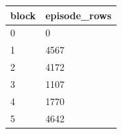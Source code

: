 \begin{tabular}{ll}
\toprule
block & episode\_rows \\
\midrule
0 & 0 \\
1 & 4567 \\
2 & 4172 \\
3 & 1107 \\
4 & 1770 \\
5 & 4642 \\
\bottomrule
\end{tabular}
